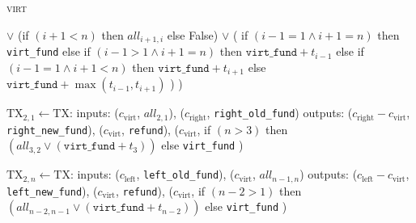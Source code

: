 \begin{center}
\begin{processbox}{\textsc{virt}}
\begin{algorithmic}[1]
              \State $\vee$ (if $(i+1 < n)$ then $\mathit{all}_{i+1, i}$ else
              False)
              \label{code:virtual-layer:mid-txs:initiator:right-all}
              \State $\vee$ (
              \Indent
                \State if $(i-1 = 1 \wedge i+1 = n)$ then \texttt{virt\_fund}
                \label{code:virtual-layer:mid-txs:initiator:i-is-2:n-is-3}
                \State else if $(i-1 > 1 \wedge i+1 = n)$ then
                $\texttt{virt\_fund} + t_{i-1}$
                \State else if $(i-1 = 1 \wedge i+1 < n)$ then
                $\texttt{virt\_fund} + t_{i+1}$
                \State else 
                $\texttt{virt\_fund} + \max{(t_{i-1}, t_{i+1})}$
              \EndIndent
              \State )
            \EndIndent
            \State )
            \label{code:virtual-layer:mid-txs:initiator:virt-out}
          \EndIndent
        \EndIndent

          \State $\mathrm{TX}_{2, 1} \gets \mathrm{TX}$:
          \Indent
            \State inputs:
            \Indent
              \State ($c_{\mathrm{virt}}$, $\mathit{all}_{2, 1}$),
              \label{code:virtual-layer:mid-txs:i-is-2:extend-interval-left:virt}
              \State ($c_{\mathrm{right}}$, \texttt{right\_old\_fund})
            \EndIndent
            \State outputs:
            \Indent
              \State ($c_{\mathrm{right}} - c_{\mathrm{virt}}$,
              \texttt{right\_new\_fund}),
              \State ($c_{\mathrm{virt}}$, \texttt{refund}),
              \State ($c_{\mathrm{virt}}$,
              \Indent
                \State if $(n > 3)$ then $(\mathit{all}_{3, 2}
                \vee (\texttt{virt\_fund} + t_3))$
                \State else \texttt{virt\_fund}
              \EndIndent
              \State )
            \EndIndent
          \EndIndent
        \EndIf

          \State $\mathrm{TX}_{2, n} \gets \mathrm{TX}$:
          \Indent
            \State inputs:
            \Indent
              \State ($c_{\mathrm{left}}$, \texttt{left\_old\_fund}),
              \State ($c_{\mathrm{virt}}$, $\mathit{all}_{n-1, n}$)
            \EndIndent
            \State outputs:
            \Indent
              \State ($c_{\mathrm{left}} - c_{\mathrm{virt}}$,
              \texttt{left\_new\_fund}),
              \State ($c_{\mathrm{virt}}$, \texttt{refund}),
              \State ($c_{\mathrm{virt}}$,
              \Indent
                \State if $(n-2 > 1)$ then $(\mathit{all}_{n-2, n-1} \vee
                (\texttt{virt\_fund} + t_{n-2}))$
                \State else \texttt{virt\_fund}
              \EndIndent
              \State )
            \EndIndent
          \EndIndent
        \EndIf


\end{algorithmic}
\end{processbox}
\end{center}
